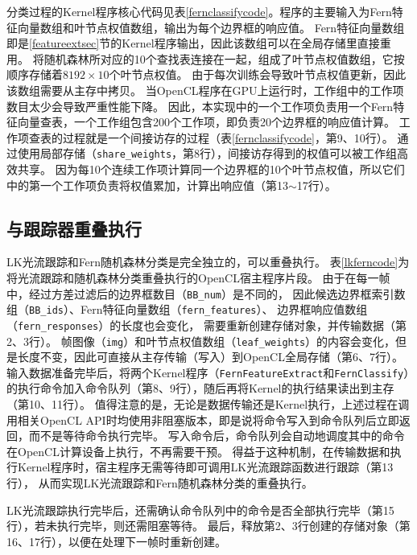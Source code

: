 分类过程的Kernel程序核心代码见表\ref{fernclassifycode}。程序的主要输入为Fern特征向量数组和叶节点权值数组，输出为每个边界框的响应值。
Fern特征向量数组即是\ref{featureextsec}节的Kernel程序输出，因此该数组可以在全局存储里直接重用。
将随机森林所对应的10个查找表连接在一起，组成了叶节点权值数组，它按顺序存储着$8192\times10$个叶节点权值。
由于每次训练会导致叶节点权值更新，因此该数组需要从主存中拷贝。
当OpenCL程序在GPU上运行时，工作组中的工作项数目太少会导致严重性能下降。
因此，本实现中的一个工作项负责用一个Fern特征向量查表，一个工作组包含200个工作项，即负责20个边界框的响应值计算。
工作项查表的过程就是一个间接访存的过程（表\ref{fernclassifycode}，第9、10行）。
通过使用局部存储（\texttt{share\_weights}，第8行），间接访存得到的权值可以被工作组高效共享。
因为每10个连续工作项计算同一个边界框的10个叶节点权值，所以它们中的第一个工作项负责将权值累加，计算出响应值（第13$\sim$17行）。

\subsection{与跟踪器重叠执行}
LK光流跟踪和Fern随机森林分类是完全独立的，可以重叠执行。
表\ref{lkferncode}为将光流跟踪和随机森林分类重叠执行的OpenCL宿主程序片段。
由于在每一帧中，经过方差过滤后的边界框数目（\texttt{BB\_num}）是不同的，
因此候选边界框索引数组（\texttt{BB\_ids}）、Fern特征向量数组（\texttt{fern\_features}）、
边界框响应值数组（\texttt{fern\_responses}）的长度也会变化，
需要重新创建存储对象，并传输数据（第2、3行）。
帧图像（\texttt{img}）和叶节点权值数组（\texttt{leaf\_weights}）的内容会变化，但是长度不变，因此可直接从主存传输（写入）到OpenCL全局存储（第6、7行）。
输入数据准备完毕后，将两个Kernel程序（\texttt{FernFeatureExtract}和\texttt{FernClassify}）的执行命令加入命令队列（第8、9行），随后再将Kernel的执行结果读出到主存（第10、11行）。
值得注意的是，无论是数据传输还是Kernel执行，上述过程在调用相关OpenCL API时均使用非阻塞版本，即是说将命令写入到命令队列后立即返回，而不是等待命令执行完毕。
写入命令后，命令队列会自动地调度其中的命令在OpenCL计算设备上执行，不再需要干预。
得益于这种机制，在传输数据和执行Kernel程序时，宿主程序无需等待即可调用LK光流跟踪函数进行跟踪（第13行），
从而实现LK光流跟踪和Fern随机森林分类的重叠执行。

LK光流跟踪执行完毕后，还需确认命令队列中的命令是否全部执行完毕（第15行），若未执行完毕，则还需阻塞等待。
最后，释放第2、3行创建的存储对象（第16、17行），以便在处理下一帧时重新创建。


